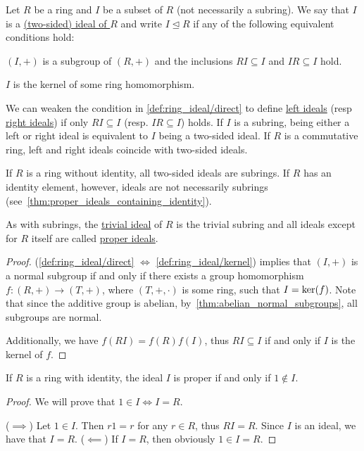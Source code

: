 \begin{definition}\label{def:ring_ideal}
  Let $R$ be a ring and $I$ be a subset of $R$ (not necessarily a subring). We say that $I$ is a \uline{(two-sided) ideal of $R$} and write $I \unlhd R$ if any of the following equivalent conditions hold:
  \begin{defenum}
    \item\label{def:ring_ideal/direct} $(I, +)$ is a subgroup of $(R, +)$ and the inclusions $RI \subseteq I$ and $IR \subseteq I$ hold.
    \item\label{def:ring_ideal/kernel} $I$ is the kernel of some ring homomorphism.
  \end{defenum}

  We can weaken the condition in \ref{def:ring_ideal/direct} to define \uline{left ideals} (resp \uline{right ideals}) if only $RI \subseteq I$ (resp. $IR \subseteq I$) holds. If $I$ is a subring, being either a left or right ideal is equivalent to $I$ being a two-sided ideal. If $R$ is a commutative ring, left and right ideals coincide with two-sided ideals.

  If $R$ is a ring without identity, all two-sided ideals are subrings. If $R$ has an identity element, however, ideals are not necessarily subrings (see~\cref{thm:proper_ideals_containing_identity}).

  As with subrings, the \uline{trivial ideal} of $R$ is the trivial subring and all ideals except for $R$ itself are called \uline{proper ideals}.
\end{definition}
\begin{proof}
  (\ref{def:ring_ideal/direct} $\iff$ \ref{def:ring_ideal/kernel})  implies that $(I, +)$ is a normal subgroup if and only if there exists a group homomorphism $f: (R, +) \to (T, +)$, where $(T, +, \cdot)$ is some ring, such that $I = \operatorname{ker}(f)$. Note that since the additive group is abelian, by~\cref{thm:abelian_normal_subgroups}, all subgroups are normal.

  Additionally, we have $f(RI) = f(R)f(I)$, thus $RI \subseteq I$ if and only if $I$ is the kernel of $f$.
\end{proof}

\begin{proposition}\label{thm:proper_ideals_containing_identity}
  If $R$ is a ring with identity, the ideal $I$ is proper if and only if $1 \not\in I$.
\end{proposition}
\begin{proof}
  We will prove that $1 \in I \iff I = R$.

  ($\implies$) Let $1 \in I$. Then $r1 = r$ for any $r \in R$, thus $RI = R$. Since $I$ is an ideal, we have that $I = R$.
  ($\impliedby$) If $I = R$, then obviously $1 \in I = R$.
\end{proof}

